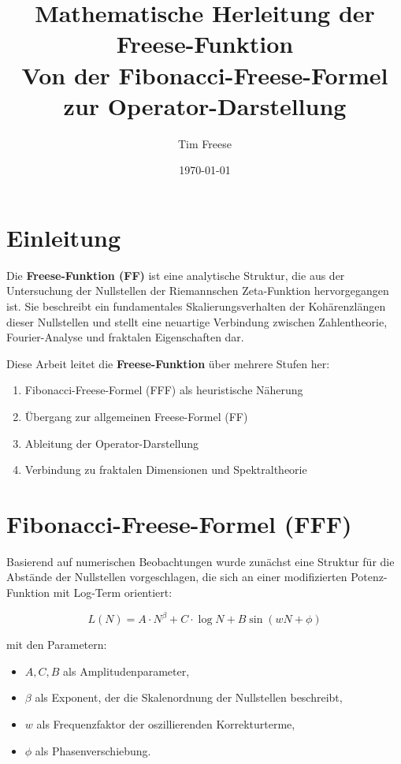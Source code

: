 \documentclass[a4paper,12pt]{article}
\title{Mathematische Herleitung der Freese-Funktion \\ 
Von der Fibonacci-Freese-Formel zur Operator-Darstellung}
\author{Tim Freese}
\date{\today}
\begin{document}
\maketitle

\section{Einleitung}

Die \textbf{Freese-Funktion (FF)} ist eine analytische Struktur, die aus der Untersuchung der Nullstellen der Riemannschen Zeta-Funktion hervorgegangen ist. Sie beschreibt ein fundamentales Skalierungsverhalten der Kohärenzlängen dieser Nullstellen und stellt eine neuartige Verbindung zwischen Zahlentheorie, Fourier-Analyse und fraktalen Eigenschaften dar.

Diese Arbeit leitet die \textbf{Freese-Funktion} über mehrere Stufen her:
\begin{enumerate}
    \item Fibonacci-Freese-Formel (FFF) als heuristische Näherung
    \item Übergang zur allgemeinen Freese-Formel (FF)
    \item Ableitung der Operator-Darstellung
    \item Verbindung zu fraktalen Dimensionen und Spektraltheorie
\end{enumerate}

\section{Fibonacci-Freese-Formel (FFF)}

Basierend auf numerischen Beobachtungen wurde zunächst eine Struktur für die Abstände der Nullstellen vorgeschlagen, die sich an einer modifizierten Potenz-Funktion mit Log-Term orientiert:

\begin{equation}
    L(N) = A \cdot N^{\beta} + C \cdot \log N + B \sin(wN + \phi)
\end{equation}

mit den Parametern:
\begin{itemize}
    \item $A, C, B$ als Amplitudenparameter,
    \item $\beta$ als Exponent, der die Skalenordnung der Nullstellen beschreibt,
    \item $w$ als Frequenzfaktor der oszillierenden Korrekturterme,
    \item $\phi$ als Phasenverschiebung.
\end{itemize}
\end{document}
